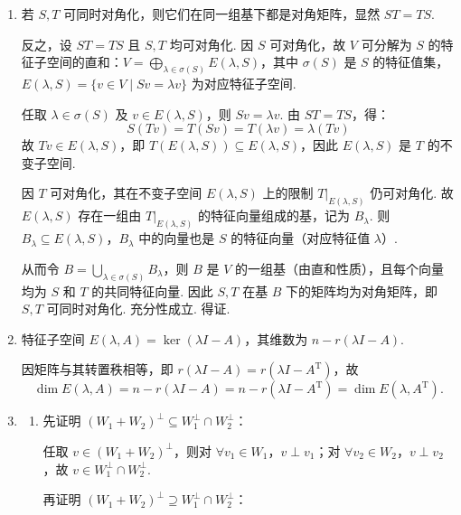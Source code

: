 \begin{enumerate}
\begin{enumerate}
        \item 次数小于 $m$ 的多项式 $1,x,\cdots,x^{m-1}$ 的等价类线性无关且张成商空间，故基为：\[\{1 + U,\ x + U,\ \cdots,\ x^{m-1} + U\}.\]
    \end{enumerate}

    \item 若 $S,T$ 可同时对角化，则它们在同一组基下都是对角矩阵，显然 $ST=TS$.

    反之，设 $ST=TS$ 且 $S,T$ 均可对角化. 因 $S$ 可对角化，故 $V$ 可分解为 $S$ 的特征子空间的直和：$V = \displaystyle\bigoplus_{\lambda \in \sigma(S)} E(\lambda, S)$，其中 $\sigma(S)$ 是 $S$ 的特征值集，$E(\lambda, S) = \{v \in V \mid Sv = \lambda v\}$ 为对应特征子空间.

    任取 $\lambda \in \sigma(S)$ 及 $v \in E(\lambda, S)$，则 $Sv = \lambda v$. 由 $ST = TS$，得：
    \[
    S(Tv) = T(Sv) = T(\lambda v) = \lambda (Tv)
    \]
    故 $Tv \in E(\lambda, S)$，即 $T(E(\lambda, S)) \subseteq E(\lambda, S)$，因此 $E(\lambda, S)$ 是 $T$ 的不变子空间.

    因 $T$ 可对角化，其在不变子空间 $E(\lambda, S)$ 上的限制 $T|_{E(\lambda, S)}$ 仍可对角化. 故 $E(\lambda, S)$ 存在一组由 $T|_{E(\lambda, S)}$ 的特征向量组成的基，记为 $B_\lambda$. 则 $B_\lambda \subseteq E(\lambda, S)$，$B_\lambda$ 中的向量也是 $S$ 的特征向量（对应特征值 $\lambda$）.

    从而令 $B = \displaystyle\bigcup_{\lambda \in \sigma(S)} B_\lambda$，则 $B$ 是 $V$ 的一组基（由直和性质），且每个向量均为 $S$ 和 $T$ 的共同特征向量. 因此 $S,T$ 在基 $B$ 下的矩阵均为对角矩阵，即 $S,T$ 可同时对角化. 充分性成立. 得证.

    \item 特征子空间 $E(\lambda, A) = \ker(\lambda I - A)$，其维数为 $n - r(\lambda I - A)$.

    因矩阵与其转置秩相等，即 $r(\lambda I - A) = r(\lambda I - A^\mathrm{T})$，故
    \[
        \dim E(\lambda, A) = n - r(\lambda I - A) = n - r(\lambda I - A^\mathrm{T}) = \dim E(\lambda, A^\mathrm{T}).
    \]

    \item \begin{enumerate}
        \item 先证明 $(W_1 + W_2)^\perp \subseteq W_1^\perp \cap W_2^\perp$：

        任取 $v\in(W_1 + W_2)^\perp$，则对 $\forall v_1\in W_1$，$v\perp v_1$；对 $\forall v_2\in W_2$，$v\perp v_2$，故 $v\in W_1^\perp \cap W_2^\perp$.

        再证明 $(W_1 + W_2)^\perp \supseteq W_1^\perp \cap W_2^\perp$：


\end{enumerate}
\end{enumerate}
